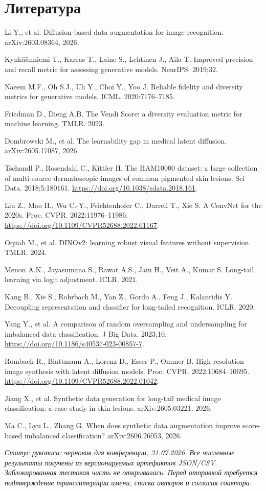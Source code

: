 \documentclass[12pt,a4paper]{article}
\begin{document}
\section*{Литература}

\footnotesize
\begin{enumerate}[label={[\arabic*]},leftmargin=2.2em,itemsep=2pt]
\item Li Y., et al. Diffusion-based data augmentation for image recognition. arXiv:2603.08364, 2026.
\item Kynkäänniemi T., Karras T., Laine S., Lehtinen J., Aila T. Improved precision and recall metric for assessing generative models. NeurIPS. 2019;32.
\item Naeem M.F., Oh S.J., Uh Y., Choi Y., Yoo J. Reliable fidelity and diversity metrics for generative models. ICML. 2020:7176--7185.
\item Friedman D., Dieng A.B. The Vendi Score: a diversity evaluation metric for machine learning. TMLR. 2023.
\item Dombrowski M., et al. The learnability gap in medical latent diffusion. arXiv:2605.17087, 2026.
\item Tschandl P., Rosendahl C., Kittler H. The HAM10000 dataset: a large collection of multi-source dermatoscopic images of common pigmented skin lesions. Sci Data. 2018;5:180161. \url{https://doi.org/10.1038/sdata.2018.161}.
\item Liu Z., Mao H., Wu C.-Y., Feichtenhofer C., Darrell T., Xie S. A ConvNet for the 2020s. Proc. CVPR. 2022:11976--11986. \url{https://doi.org/10.1109/CVPR52688.2022.01167}.
\item Oquab M., et al. DINOv2: learning robust visual features without supervision. TMLR. 2024.
\item Menon A.K., Jayasumana S., Rawat A.S., Jain H., Veit A., Kumar S. Long-tail learning via logit adjustment. ICLR. 2021.
\item Kang B., Xie S., Rohrbach M., Yan Z., Gordo A., Feng J., Kalantidis Y. Decoupling representation and classifier for long-tailed recognition. ICLR. 2020.
\item Yang Y., et al. A comparison of random oversampling and undersampling for imbalanced data classification. J Big Data. 2023;10. \url{https://doi.org/10.1186/s40537-023-00857-7}.
\item Rombach R., Blattmann A., Lorenz D., Esser P., Ommer B. High-resolution image synthesis with latent diffusion models. Proc. CVPR. 2022:10684--10695. \url{https://doi.org/10.1109/CVPR52688.2022.01042}.
\item Jiang X., et al. Synthetic data generation for long-tail medical image classification: a case study in skin lesions. arXiv:2605.03221, 2026.
\item Ma C., Lyu L., Zhang G. When does synthetic data augmentation improve score-based imbalanced classification? arXiv:2606.26053, 2026.
\end{enumerate}
\normalsize

\vfill
\noindent\footnotesize\textit{Статус рукописи: черновик для конференции, 31.07.2026. Все численные результаты получены из версионируемых артефактов JSON/CSV. Заблокированная тестовая часть не открывалась. Перед отправкой требуется подтверждение транслитерации имени, списка авторов и согласия соавтора.}
\end{document}
